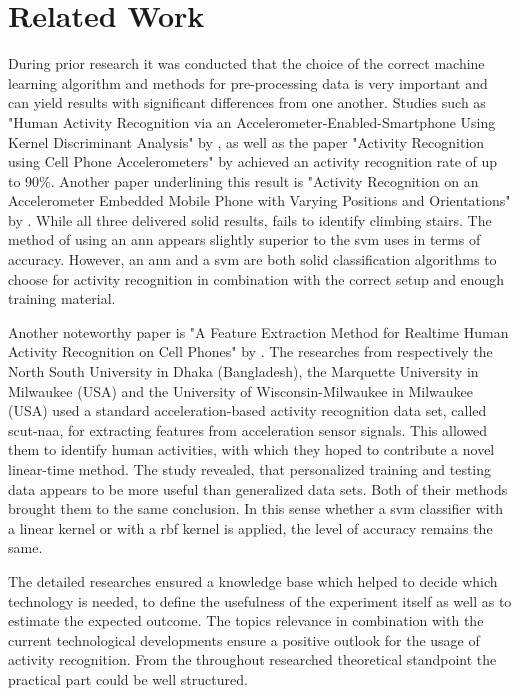 \section{Related Work}
\label{section:related}

During prior research it was conducted that the choice of the correct machine learning algorithm and methods for pre-processing data is very important and can yield results with significant differences from one another. Studies such as "Human Activity Recognition via an Accelerometer-Enabled-Smartphone Using Kernel Discriminant Analysis" by \textcite[]{khan2010human}, as well as the paper "Activity Recognition using Cell Phone Accelerometers" by \textcite[]{kwapisz2011activity} achieved an activity recognition rate of up to 90\%. Another paper underlining this result is "Activity Recognition on an Accelerometer Embedded Mobile Phone with Varying Positions and Orientations" by \textcite[]{sun2010activity}. While all three delivered solid results, \textcite[]{kwapisz2011activity} fails to identify climbing stairs. The method of \textcite[]{khan2010human} using an \gls{ann} appears slightly superior to the \gls{svm} \textcite[]{sun2010activity} uses in terms of accuracy. However, an \gls{ann} and a \gls{svm} are both solid classification algorithms to choose for activity recognition in combination with the correct setup and enough training material.

Another noteworthy paper is "A Feature Extraction Method for Realtime Human Activity Recognition on Cell Phones" by \textcite[]{khan2011feature}. The researches from respectively the North South University in Dhaka (Bangladesh), the Marquette University in Milwaukee (USA) and the University of Wisconsin-Milwaukee in Milwaukee (USA) used a standard acceleration-based activity recognition data set, called \gls{scut-naa}, for extracting features from acceleration sensor signals. This allowed them to identify human activities, with which they hoped to contribute a novel linear-time method. The study revealed, that personalized training and testing data appears to be more useful than generalized data sets. Both of their methods brought them to the same conclusion. In this sense whether a \gls{svm} classifier with a linear kernel or with a \gls{rbf} kernel is applied, the level of accuracy remains the same.

The detailed researches ensured a knowledge base which helped to decide which technology is needed, to define the usefulness of the experiment itself as well as to estimate the expected outcome. The topics relevance in combination with the current technological developments ensure a positive outlook for the usage of activity recognition. From the throughout researched theoretical standpoint the practical part could be well structured. 


